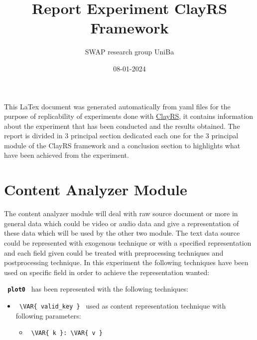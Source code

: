\documentclass[11pt]{article}
\title{Report Experiment ClayRS Framework}
\author{SWAP research group UniBa}
\date{08-01-2024}
\begin{document}
\maketitle
This LaTex document was generated automatically from yaml files for the purpose of replicability of experiments done with
\href{https://github.com/swapUniba/ClayRS}{ClayRS},
it contains information about the experiment that has been conducted and the results obtained.
The report is divided in 3 principal section dedicated each one for the 3 principal module of the ClayRS framework
and a conclusion section to highlights what have been achieved from the experiment.
\hfill\break
\hfill\break



\section{Content Analyzer Module}\label{sec:ca}
The content analyzer module will deal with raw source document or more in general data which could be
video or audio data and give a representation of these data which will be used by the other two module.
The text data source could be represented with exogenous technique or with a specified representation
and each field given could be treated with preprocessing techniques and postprocessing technique.
In this experiment the following techniques have been used on specific field in order to achieve the
representation wanted:
\hfill\break
\hfill\break



\textbf{\lstinline[style=verbatim-text]| plot0 |} has been represented with the following techniques:
\hfill\break
\hfill\break

\begin{itemize}

        \item
        \verb| \VAR{ valid_key } | used as content representation technique with following parameters:
        \begin{itemize}
                \item
                \verb| \VAR{ k }: \VAR{ v }|
        \end{itemize}
\end{itemize}
\hfill\break
\hfill\break
\end{document}
